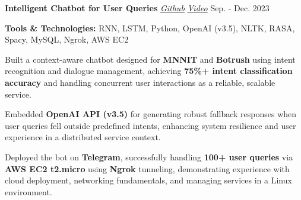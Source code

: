     \resumeProject
      {{\textbf{Intelligent Chatbot for User Queries}} \href{https://github.com/dubeykirtiman/MNNIT_ChatBot}{\textit{\small{Github}}} \textbar{} \href{https://www.youtube.com/watch?v=mfgmaNysABo}{\textit{\small{Video}}}}
      {}
      {Sep. - Dec. 2023}
      {}
      \resumeItemListStart
        \item \textbf{Tools \& Technologies:} RNN, LSTM, Python, OpenAI (v3.5), NLTK, RASA, Spacy, MySQL, Ngrok, AWS EC2
        \item Built a context-aware chatbot designed for \textbf{MNNIT} and \textbf{Botrush} using intent recognition and dialogue management, achieving \textbf{75\%+ intent classification accuracy} and handling concurrent user interactions as a reliable, scalable service.
        \item Embedded \textbf{OpenAI API (v3.5)} for generating robust fallback responses when user queries fell outside predefined intents, enhancing system resilience and user experience in a distributed service context.
        \item Deployed the bot on \textbf{Telegram}, successfully handling \textbf{100+ user queries} via \textbf{AWS EC2 t2.micro} using \textbf{Ngrok} tunneling, demonstrating experience with cloud deployment, networking fundamentals, and managing services in a Linux environment.
      \resumeItemListEnd
\resumeSubHeadingListEnd